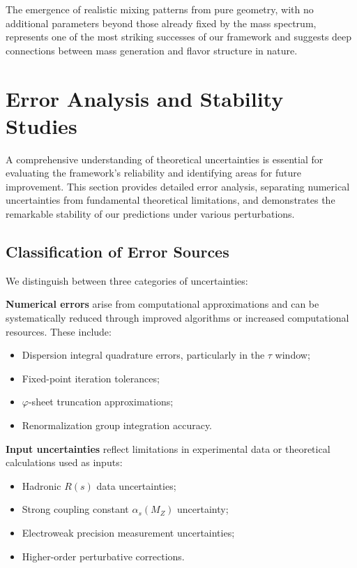 \documentclass[%
amsmath,amssymb,
aps,
prb,
floatfix,
twocolumn
]{revtex4-2}
\begin{document}
The emergence of realistic mixing patterns from pure geometry, with no additional parameters beyond those already fixed by the mass spectrum, represents one of the most striking successes of our framework and suggests deep connections between mass generation and flavor structure in nature.

\section{Error Analysis and Stability Studies}
\label{sec:error_stability}

A comprehensive understanding of theoretical uncertainties is essential for evaluating the framework's reliability and identifying areas for future improvement. This section provides detailed error analysis, separating numerical uncertainties from fundamental theoretical limitations, and demonstrates the remarkable stability of our predictions under various perturbations.

\subsection{Classification of Error Sources}

We distinguish between three categories of uncertainties:

\textbf{Numerical errors} arise from computational approximations and can be systematically reduced through improved algorithms or increased computational resources. These include:
\begin{itemize}
\item Dispersion integral quadrature errors, particularly in the $\tau$ window;
\item Fixed-point iteration tolerances;
\item $\varphi$-sheet truncation approximations;
\item Renormalization group integration accuracy.
\end{itemize}

\textbf{Input uncertainties} reflect limitations in experimental data or theoretical calculations used as inputs:
\begin{itemize}
\item Hadronic $R(s)$ data uncertainties;
\item Strong coupling constant $\alpha_s(M_Z)$ uncertainty;
\item Electroweak precision measurement uncertainties;
\item Higher-order perturbative corrections.
\end{itemize}
\end{document}
